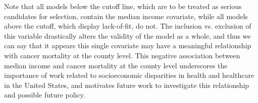 		Note that all models below the cutoff line, which are to be treated as serious candidates for selection, contain the median income covariate, while all models
		above the cutoff, which display lack-of-fit, do not. The inclusion vs. exclusion of this variable drastically alters the validity of the model as a whole, and
		thus we can say that it appears this single covariate may have a meaningful relationship with cancer mortality at the county level. This negative association between
		median income and cancer mortality at the county level underscores the importance of work related to socioeconomic disparities in health and healthcare in the United States,
		and motivates future work to investigate this relationship and possible future policy.

